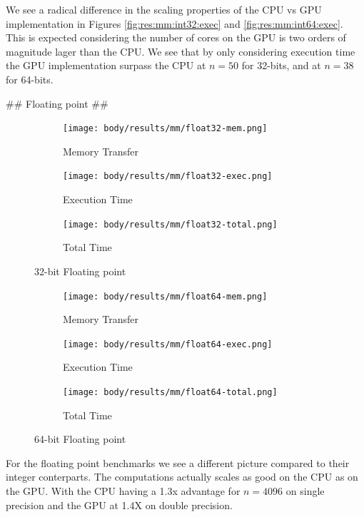 \begin{markdown}
We see a radical difference in the scaling properties of the CPU vs
GPU implementation in Figures \ref{fig:res:mm:int32:exec} and
\ref{fig:res:mm:int64:exec}. This is expected considering the number
of cores on the GPU is two orders of magnitude lager than the CPU. We
see that by only considering execution time the GPU implementation
surpass the CPU at $n=50$ for 32-bits, and at $n=38$ for 64-bits.

## Floating point ##

\begin{figure}[H]
  \centering
  \begin{subfigure}{.33\textwidth}
    \centering
    \texttt{[image: body/results/mm/float32-mem.png]}
    \caption{Memory Transfer}
    \label{fig:res:mm:float32:mem}
  \end{subfigure}%
  \begin{subfigure}{.33\textwidth}
    \centering
    \texttt{[image: body/results/mm/float32-exec.png]}
    \caption{Execution Time}
    \label{fig:res:mm:float32:exec}
  \end{subfigure}%
  \begin{subfigure}{.33\textwidth}
    \centering
    \texttt{[image: body/results/mm/float32-total.png]}
    \caption{Total Time}
    \label{fig:res:mm:float32:tot}
  \end{subfigure}
  \caption{32-bit Floating point}
  \label{fig:res:mm:float32}
\end{figure}


\begin{figure}[H]
  \centering
  \begin{subfigure}{.33\textwidth}
    \centering
    \texttt{[image: body/results/mm/float64-mem.png]}
    \caption{Memory Transfer}
    \label{fig:res:mm:float64:mem}
  \end{subfigure}%
  \begin{subfigure}{.33\textwidth}
    \centering
    \texttt{[image: body/results/mm/float64-exec.png]}
    \caption{Execution Time}
    \label{fig:res:mm:float64:exec}
  \end{subfigure}%
  \begin{subfigure}{.33\textwidth}
    \centering
    \texttt{[image: body/results/mm/float64-total.png]}
    \caption{Total Time}
    \label{fig:res:mm:float64:tot}
  \end{subfigure}
  \caption{64-bit Floating point}
  \label{fig:res:mm:float64}
\end{figure}

For the floating point benchmarks we see a different picture compared
to their integer conterparts. The computations actually scales as good
on the CPU as on the GPU. With the CPU having a 1.3x advantage for
$n=4096$ on single precision and the GPU at 1.4X on double precision.


\end{markdown}
